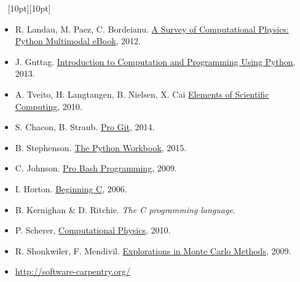 \documentclass[letterpaper,10pt,onecolumn]{article}
\begin{document}
\vspace{0.2cm}
\noindent \hrulefill~ \raisebox{-1pt}[10pt][10pt]{\leafleft}~ \hrulefill
\small
\begin{itemize}
\item  R. Landau, M. Paez, C. Bordeianu. \href{http://www.compadre.org/psrc/items/detail.cfm?ID=11578}{A Survey of Computational Physics: Python Multimodal eBook}, 2012.
\item  J. Guttag. \href{http://mitpress.mit.edu/books/introduction-computation-and-programming-using-python-0}{Introduction to Computation and Programming Using Python}, 2013.
\item  A. Tveito, H. Langtangen, B. Nielsen, X. Cai  \href{http://link.springer.com.ezproxy.uniandes.edu.co:8080/book/10.1007\%2F978-3-642-11299-7}{Elements of Scientific Computing}, 2010.
\item S. Chacon, B. Straub. \href{http://link.springer.com.ezproxy.uniandes.edu.co:8080/book/10.1007\%2F978-1-4302-1834-0}{Pro Git}, 2014.
\item B. Stephenson. \href{http://link.springer.com.ezproxy.uniandes.edu.co:8080/book/10.1007\%2F978-3-319-14240-1}{The Python Workbook}, 2015.
\item C. Johnson. \href{http://link.springer.com.ezproxy.uniandes.edu.co:8080/book/10.1007\%2F978-1-4302-1998-9}{Pro Bash Programming}, 2009.
\item I. Horton. \href{http://link.springer.com.ezproxy.uniandes.edu.co:8080/book/10.1007\%2F978-1-4302-0243-1}{Beginning C}, 2006.
\item B. Kernighan \& D. Ritchie. \textit{The C programming language.}
\item P. Scherer, \href{http://link.springer.com.ezproxy.uniandes.edu.co:8080/book/10.1007\%2F978-3-642-13990-1}{Computational Physics}, 2010.
\item R. Shonkwiler, F. Mendivil.  \href{http://link.springer.com.ezproxy.uniandes.edu.co:8080/book/10.1007\%2F978-0-387-87837-9}{Explorations in Monte Carlo Methods}, 2009.
\item\url{http://software-carpentry.org/}
\end{itemize}

\end{document}
